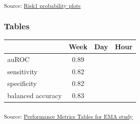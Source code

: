 \documentclass[
]{agujournal2019}
\begin{document}
\begin{figure}[H]


\caption{\label{fig-day-high_dec_thres}}

\end{figure}%

\textsubscript{Source:
\href{https://jjcurtin.github.io/lectures_science/notebooks/ema_figs_probability-preview.html\#cell-fig-day-high_dec_thres}{Risk1
probability plots}}

\subsubsection{Tables}\label{tables}

\label{table-metrics-week_only}
\begin{longtable}[]{@{}lccc@{}}
\toprule\noalign{}
& Week & Day & Hour \\
\midrule\noalign{}
\endhead
\bottomrule\noalign{}
\endlastfoot
auROC & 0.89 & & \\
sensitivity & 0.82 & & \\
specificity & 0.82 & & \\
balanced accuracy & 0.83 & & \\
\end{longtable}

\textsubscript{Source:
\href{https://jjcurtin.github.io/lectures_science/notebooks/ema_tables_metrics-preview.html\#cell-table-metrics-week_only}{Performance
Metrics Tables for EMA study}}
\end{document}
